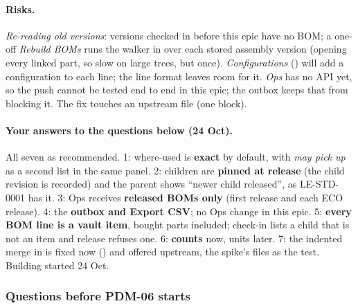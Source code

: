 \paragraph{Risks.} \emph{Re-reading old versions}: versions checked in before this epic have no BOM; a one-off
\emph{Rebuild BOMs} runs the walker in  over each stored assembly version (opening every linked part, so
slow on large trees, but once). \emph{Configurations} () will add a configuration to each line; the line
format leaves room for it. \emph{Ops} has no API yet, so the push cannot be tested end to end in this epic; the outbox
keeps that from blocking it. The  fix touches an upstream file (one \code{[BW]} block).

\paragraph{Your answers to the questions below (24 Oct).} All seven as recommended. 1: where-used is \textbf{exact} by
default, with \emph{may pick up} as a second list in the same panel. 2: children are \textbf{pinned at release} (the
child revision is recorded) and the parent shows ``newer child released'', as LE-STD-0001 has it. 3: Ops receives
\textbf{released BOMs only} (first release and each ECO release). 4: the \textbf{outbox and Export CSV}; no Ops change
in this epic. 5: \textbf{every BOM line is a vault item}, bought parts included; check-in lists a child that is not an
item and release refuses one. 6: \textbf{counts} now, units later. 7: the indented merge in  is
fixed now (\code{[BW]}) and offered upstream, the spike's files as the test. Building started 24 Oct.

\subsubsection*{Questions before PDM-06 starts}

